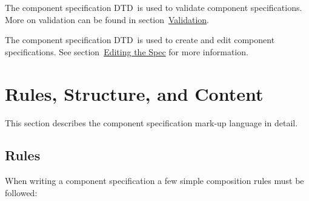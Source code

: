 \documentclass{article}
\newcommand{\acronym}[1]{#1}
\newcommand{\dtd}{\acronym{DTD}}
\newcommand{\sectitle}[1]{\emph{#1}}
\newcommand{\sechyperref}[1]{\hyperref{\sectitle{#1}}{}{}{#1}}
\newcommand{\SECcontent}{Rules, Structure, and Content}
\newcommand{\SUBSECrules}{Rules}
\newcommand{\SECediting}{Editing the Spec}
\newcommand{\SECvalidation}{Validation}
\begin{document}
The component specification \dtd\ is used to validate component
specifications.  More on validation can be found in
section~\sechyperref{\SECvalidation}.

The component specification \dtd\ is used to create and edit component
specifications.  See
section~\sechyperref{\SECediting} for more
information.

\section{\SECcontent}
\label{\SECcontent}

This section describes the component specification mark-up language in
detail.

\subsection{\SUBSECrules}
\label{\SUBSECrules}

When writing a component specification a few simple composition rules
must be followed:
\end{document}

